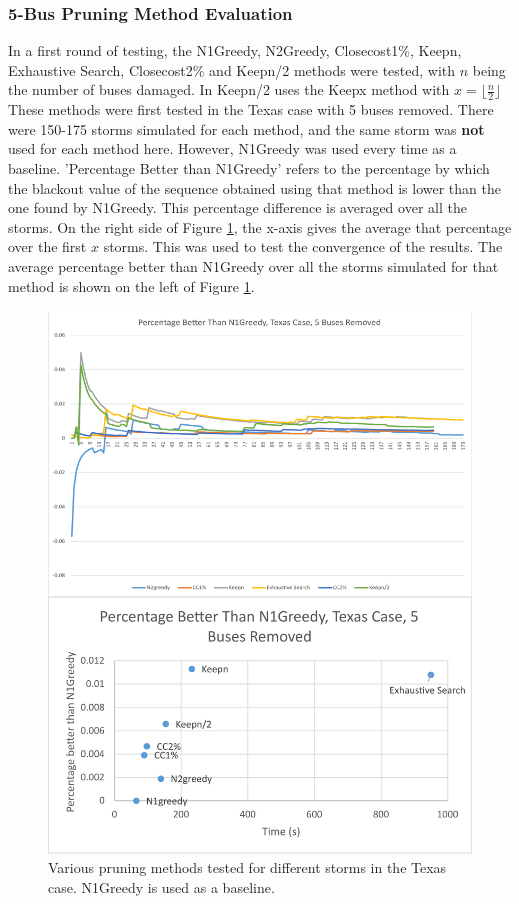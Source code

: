 \documentclass[12pt]{article}
\begin{document}
\subsubsection{5-Bus Pruning Method Evaluation} \label{5buseval}

In a first round of testing, the N1Greedy, N2Greedy, Closecost1\%, Keepn, Exhaustive Search, Closecost2\% and Keepn/2 methods were tested, with $n$ being the number of buses damaged. In Keepn/2 uses the Keepx method with $x = \lfloor \frac{n}{2} \rfloor$  These methods were first tested in the Texas case with 5 buses removed. There were 150-175 storms simulated for each method, and the same storm was \textbf{not} used for each method here. However, N1Greedy was used every time as a baseline. 'Percentage Better than N1Greedy' refers to the percentage by which the blackout value of the sequence obtained using that method is lower than the one found by N1Greedy. This percentage difference is averaged over all the storms. On the right side of  Figure \ref{fig:Texas5busr1}, the x-axis gives the average that percentage over the first $x$ storms. This was used to test the convergence of the results. The average percentage better than N1Greedy over all the storms simulated for that method is shown on the left of Figure \ref{fig:Texas5busr1}.

\begin{figure}[ht]
    \centering %
    \includegraphics[scale = 0.24]{Texas5busr1.pdf}
    \caption[Initial Testing - 5 buses removed, Texas Case]{Various pruning methods tested for different storms in the Texas case. N1Greedy is used as a baseline.}
    \label{fig:Texas5busr1}
\end{figure}
\end{document}
